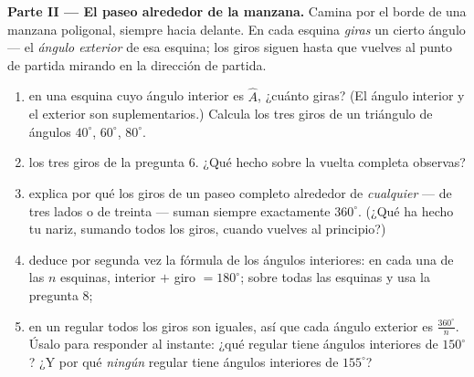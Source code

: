 \begin{problem}
\medskip
\noindent\textbf{Parte II --- El paseo alrededor de la manzana.}
Camina por el borde de una manzana poligonal, siempre hacia delante. En
cada esquina \emph{giras} un cierto ángulo --- el \emph{ángulo
exterior} de esa esquina; los giros siguen hasta que vuelves al
punto de partida mirando en la dirección de partida.
\begin{enumerate}[resume]
  \item en una esquina cuyo ángulo interior es $\widehat A$, ¿cuánto
        giras? (El ángulo interior y el exterior son
        suplementarios.) Calcula
        los tres giros de un triángulo de ángulos $40^\circ$,
        $60^\circ$, $80^\circ$.
  \item {} los tres giros de la pregunta 6. ¿Qué hecho sobre la vuelta
        completa observas?
  \item explica por qué los giros de un paseo completo alrededor de
        \emph{cualquier}  --- de tres lados o de treinta --- suman
        siempre exactamente $360^\circ$. (¿Qué ha hecho tu nariz, sumando todos
        los giros, cuando vuelves al principio?)
  \item deduce por segunda vez la fórmula de los ángulos interiores: en cada
        una de las $n$ esquinas, interior $+$ giro $= 180^\circ$; 
        sobre todas las esquinas y usa la pregunta 8;
  \item en un  regular todos los giros son iguales, así que cada
        ángulo exterior es $\frac{360^\circ}{n}$. Úsalo para
        responder al instante: ¿qué  regular tiene ángulos
        interiores de $150^\circ$? ¿Y por qué \emph{ningún}
         regular tiene ángulos interiores de $155^\circ$?
\end{enumerate}


\end{problem}
